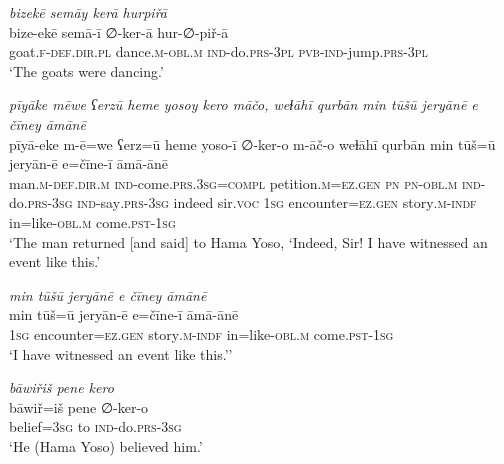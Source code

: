 \ea \label{ŽP.56}
\textit{bizekē semāy kerā hurpiřā} \\ 
\gll bize-ekē semā-ī ∅-ker-ā hur-∅-piř-ā \\ 
 goat\textsc{.f}\textsc{-def}\textsc{.dir}\textsc{.pl} dance\textsc{.m}\textsc{-obl}\textsc{.m} \textsc{ind-}do\textsc{.prs}\textsc{-3pl} \textsc{pvb-}\textsc{ind-}jump\textsc{.prs}\textsc{-3pl} \\ 
\glt `The goats were dancing.'
\z 
 
\ea \label{ŽP.57}
\textit{pīyāke mēwe ʕerzū heme yosoy kero māčo, weɫāhī qurbān min tūšū jeryānē e čīney āmānē} \\ 
\gll pīyā-eke m-ē=we ʕerz=ū heme yoso-ī ∅-ker-o m-āč-o weɫāhī qurbān min tūš=ū jeryān-ē e=čīne-ī āmā-ānē \\ 
 man\textsc{.m}\textsc{-def}\textsc{.dir}\textsc{.m} \textsc{ind-}come\textsc{.prs}\textsc{.3sg}\textsc{=compl} petition\textsc{.m}\textsc{\textsc{=ez.gen}} \textsc{pn} \textsc{pn}\textsc{-obl}\textsc{.m} \textsc{ind-}do\textsc{.prs}\textsc{-3sg} \textsc{ind-}say\textsc{.prs}\textsc{-3sg} indeed sir.\textsc{voc} \textsc{1sg} encounter\textsc{\textsc{=ez.gen}} story\textsc{.m}\textsc{-indf} in=like\textsc{-obl}\textsc{.m} come\textsc{.pst}\textsc{-\textsc{1sg}} \\ 
\glt `The man returned [and said] to Hama Yoso, ‘Indeed, Sir! I have witnessed an event like this.'
\z 
 
\ea \label{ŽP.58}
\textit{min tūšū jeryānē e čīney āmānē} \\ 
\gll min tūš=ū jeryān-ē e=čīne-ī āmā-ānē \\ 
 \textsc{1sg} encounter\textsc{\textsc{=ez.gen}} story\textsc{.m}\textsc{-indf} in=like\textsc{-obl}\textsc{.m} come\textsc{.pst}\textsc{-\textsc{1sg}} \\ 
\glt `I have witnessed an event like this.’'
\z 
 
\ea \label{ŽP.59}
\textit{bāwiřiš pene kero} \\ 
\gll bāwiř=iš pene ∅-ker-o \\ 
 belief\textsc{=3sg} to \textsc{ind-}do\textsc{.prs}\textsc{-3sg} \\ 
\glt `He (Hama Yoso) believed him.'
\z 
 
